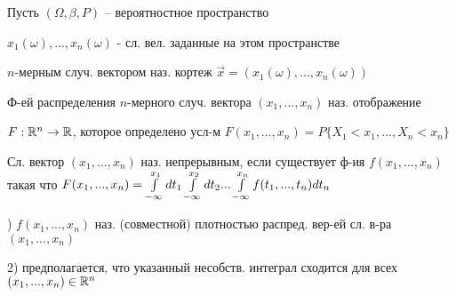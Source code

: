 
Пусть $(\Omega, \beta, P)$ -- вероятностное пространство

$x_1(\omega),...,x_n(\omega)$ - сл. вел. заданные на этом пространстве

\OPR $n$-мерным случ. вектором наз. кортеж $\overrightarrow{x}=(x_1(\omega),...,x_n(\omega))$

\OPR Ф-ей распределения $n$-мерного случ. вектора $(x_1,...,x_n)$ наз. отображение 

$F:\mathbb{R}^n\rightarrow\mathbb{R}$, которое определено усл-м $F(x_1,...,x_n)=P\{X_1<x_1,...,X_n<x_n\}$

\OPR Сл. вектор $(x_1,...,x_n)$ наз. непрерывным, если существует ф-ия $f(x_1,...,x_n)$ такая что $F(x_1,...,x_n)=\int\limits_{-\infty}^{x_1}dt_1\int\limits_{-\infty}^{x_2}dt_2...\int\limits_{-\infty}^{x_n}f(t_1,...,t_n)dt_n$

) $f(x_1,...,x_n)$ наз. (совместной) плотностью распред. вер-ей сл. в-ра $(x_1,...,x_n)$

2) предполагается, что указанный несобств. интеграл сходится для всех $(x_1,...,x_n)\in\mathbb{R}^n$

